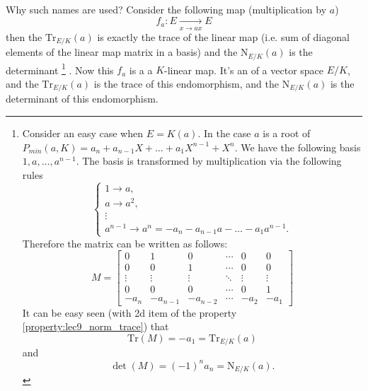 Why such names are used? Consider the following map
(multiplication by $a$)
\[
f_a: E \xrightarrow[x \to a x]{} E
\]
then the $\mathrm{Tr}_{E/K}\left(a\right)$ is exactly the trace of the
linear map (i.e. sum of diagonal elements of the linear map matrix in
a basis) and the $\mathrm{N}_{E/K}\left(a\right)$ is the
determinant
\footnote{
  Consider an easy case when $E = K\left(a\right)$. In the case
  $a$ is a root of $P_{min}\left(a, K\right) = a_n + a_{n-1} X + \dots +
  a_1 X^{n-1} + X^{n}$.
  We have the following basis $1, a, \dots, a^{n-1}$. The basis is
  transformed by multiplication via the following rules
  \[
  \begin{cases}
    1 \to a, \\
    a \to a^2, \\
    \vdots \\
    a^{n-1} \to a^n = -a_n - a_{n-1} a - \dots -
    a_1 a^{n-1}.
  \end{cases}
  \]
  Therefore the  matrix can be written as
  follows: 
  \[
  M = 
  \begin{bmatrix}
    0 & 1 & 0 & \cdots & 0 & 0 \\
    0 & 0 & 1 & \cdots & 0 & 0 \\
    \vdots & \vdots & \vdots & \ddots & \vdots & \vdots \\
    0 & 0 & 0 & \cdots & 0 & 1 \\
    -a_n & -a_{n-1} & -a_{n-2} & \cdots & -a_2 & -a_1 
  \end{bmatrix}
  \]
  It can be easy seen (with 2d item of
  the property \ref{property:lec9_norm_trace}) that
  \[
  \mathrm{Tr}\left(M\right) = -a_1 = 
  \mathrm{Tr}_{E/K}\left(a\right)
  \]
  and
  \[
  \det\left(M\right) = 
  (-1)^n a_n = 
  \mathrm{N}_{E/K}\left(a\right).
  \]  
}
. Now this $f_a$ is a a $K$-linear map. It's an
 of a vector space $E/K$, and
the $\mathrm{Tr}_{E/K}\left(a\right)$ is
the trace of this endomorphism, and the
$\mathrm{N}_{E/K}\left(a\right)$ is the determinant of this endomorphism.  

